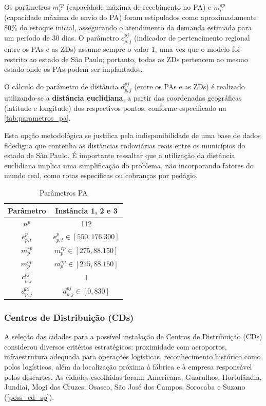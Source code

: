 Os parâmetros $m^{rp}_{p}$ (capacidade máxima de recebimento no PA) e $m^{ap}_{p}$ (capacidade máxima de envio do PA) foram estipulados como aproximadamente 80\% do estoque inicial, assegurando o atendimento da demanda estimada para um período de 30 dias. O parâmetro $c^{pj}_{p,j}$ (indicador de pertencimento regional entre os PAs e as ZDs) assume sempre o valor 1, uma vez que o modelo foi restrito ao estado de São Paulo; portanto, todas as ZDs pertencem ao mesmo estado onde os PAs podem ser implantados.

O cálculo do parâmetro de distância $d^{pj}_{p,j}$ (entre os PAs e as ZDs) é realizado utilizando-se a \textbf{distância euclidiana}, a partir das coordenadas geográficas (latitude e longitude) dos respectivos pontos, conforme especificado na \autoref{tab:parametros_pa}.

Esta opção metodológica se justifica pela indisponibilidade de uma base de dados fidedigna que contenha as distâncias rodoviárias reais entre os municípios do estado de São Paulo. É importante ressaltar que a utilização da distância euclidiana implica uma simplificação do problema, não incorporando fatores do mundo real, como rotas específicas ou cobranças por pedágio.

\begin{table}[h!]
\centering
\caption{Parâmetros PA}
\label{tab:parametros_pa}
\begin{tabular}{|c|c|}
\hline
\textbf{Parâmetro} & \textbf{Instância 1, 2 e 3} \\
\hline
$n^{p}$ & 112 \\
\hline
$e^{p}_{p,t}$ & $e^{p}_{p,t} \in [550, 176.300]$ \\
\hline
$m^{rp}_{p}$ & $m^{rp}_{p} \in [275, 88.150]$ \\
\hline
$m^{ap}_{p}$ & $m^{ap}_{p} \in [275, 88.150]$ \\
\hline
$c^{pj}_{p,j}$ & 1 \\
\hline
$d^{pj}_{p,j}$ & $d^{pj}_{p,j} \in [0, 830]$ \\
\hline
\end{tabular}
\end{table}

\subsubsection{Centros de Distribuição (CDs)}
\label{Centros de Distribuição}

A seleção das cidades para a possível instalação de Centros de Distribuição (CDs) considerou diversos critérios estratégicos: proximidade com aeroportos, infraestrutura adequada para operações logísticas, reconhecimento histórico como polos logísticos, além da localização próxima à fábrica e à empresa responsável pelos descartes. As cidades escolhidas foram: Americana, Guarulhos, Hortolândia, Jundiaí, Mogi das Cruzes, Osasco, São José dos Campos, Sorocaba e Suzano (\autoref{poss_cd_sp}).

